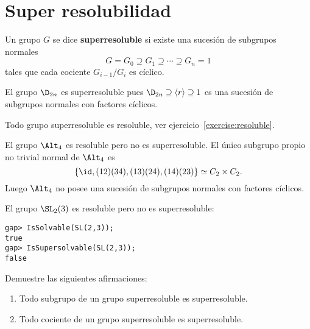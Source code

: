 \chapter{Super resolubilidad}

\label{super}

\begin{definition}
	Un grupo $G$ se dice \textbf{superresoluble} si existe una sucesión de
	subgrupos normales
	\[
		G=G_0\supseteq G_1\supseteq\cdots\supseteq G_n=1
	\]
	tales que cada cociente $G_{i-1}/G_i$ es cíclico.
\end{definition}

\begin{example}
	El grupo $\D_{2n}$ es superresoluble pues $\D_{2n}\supseteq \langle
	r\rangle\supseteq 1$ es una sucesión de subgrupos normales con factores
	cíclicos.
\end{example}

\begin{remark}
	Todo grupo superresoluble es resoluble, ver ejercicio~\ref{exercise:resoluble}.
\end{remark}

\begin{example}
	El grupo $\Alt_4$ es resoluble pero no es superresoluble. El único 
	subgrupo propio no trivial normal de $\Alt_4$ es
	\[
	\{\id,(12)(34),(13)(24),(14)(23)\}\simeq C_2\times C_2.
	\]
	Luego $\Alt_4$ no posee una sucesión de subgrupos normales con factores
	cíclicos.	
\end{example}


\begin{example}
	El grupo $\SL_2(3)$ es resoluble pero no es superresoluble:
\begin{lstlisting}
gap> IsSolvable(SL(2,3));
true
gap> IsSupersolvable(SL(2,3));
false
\end{lstlisting}
\end{example}

\begin{exercise}
	\label{exercise:super}
	Demuestre las siguientes afirmaciones:
	\begin{enumerate}
		\item Todo subgrupo de un grupo superresoluble es superresoluble.
		\item Todo cociente de un grupo superresoluble es superresoluble.
	\end{enumerate}
\end{exercise}

